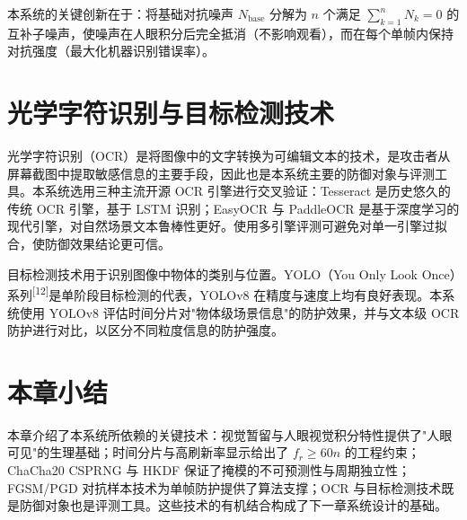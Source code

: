 本系统的关键创新在于：将基础对抗噪声 $N_{\text{base}}$ 分解为 $n$ 个满足 $\sum_{k=1}^{n} N_k = 0$ 的互补子噪声，使噪声在人眼积分后完全抵消（不影响观看），而在每个单帧内保持对抗强度（最大化机器识别错误率）。

\section{光学字符识别与目标检测技术}

光学字符识别（OCR）是将图像中的文字转换为可编辑文本的技术，是攻击者从屏幕截图中提取敏感信息的主要手段，因此也是本系统主要的防御对象与评测工具。本系统选用三种主流开源 OCR 引擎进行交叉验证：Tesseract 是历史悠久的传统 OCR 引擎，基于 LSTM 识别；EasyOCR 与 PaddleOCR 是基于深度学习的现代引擎，对自然场景文本鲁棒性更好。使用多引擎评测可避免对单一引擎过拟合，使防御效果结论更可信。

目标检测技术用于识别图像中物体的类别与位置。YOLO（You Only Look Once）系列\textsuperscript{[12]}是单阶段目标检测的代表，YOLOv8 在精度与速度上均有良好表现。本系统使用 YOLOv8 评估时间分片对"物体级场景信息"的防护效果，并与文本级 OCR 防护进行对比，以区分不同粒度信息的防护强度。

\section{本章小结}

本章介绍了本系统所依赖的关键技术：视觉暂留与人眼视觉积分特性提供了"人眼可见"的生理基础；时间分片与高刷新率显示给出了 $f_r \ge 60n$ 的工程约束；ChaCha20 CSPRNG 与 HKDF 保证了掩模的不可预测性与周期独立性；FGSM/PGD 对抗样本技术为单帧防护提供了算法支撑；OCR 与目标检测技术既是防御对象也是评测工具。这些技术的有机结合构成了下一章系统设计的基础。
